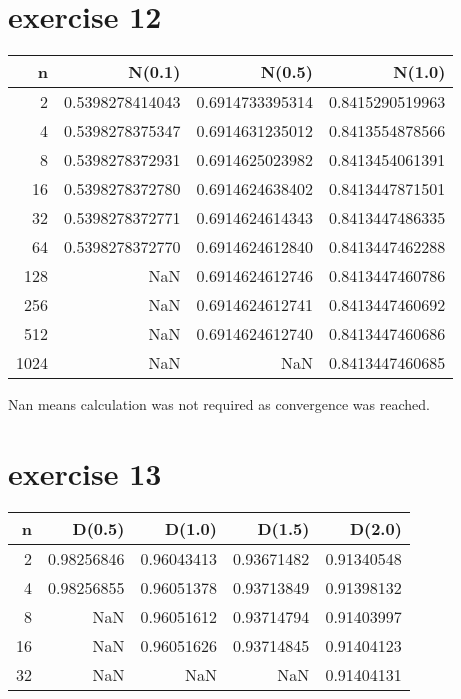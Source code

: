 \documentclass{article}
\begin{document}
\section{exercise 12}
\begin{tabular}{rrrr}
    \toprule
    n    & N(0.1)          & N(0.5)          & N(1.0)          \\
    \midrule
    2    & 0.5398278414043 & 0.6914733395314 & 0.8415290519963 \\
    4    & 0.5398278375347 & 0.6914631235012 & 0.8413554878566 \\
    8    & 0.5398278372931 & 0.6914625023982 & 0.8413454061391 \\
    16   & 0.5398278372780 & 0.6914624638402 & 0.8413447871501 \\
    32   & 0.5398278372771 & 0.6914624614343 & 0.8413447486335 \\
    64   & 0.5398278372770 & 0.6914624612840 & 0.8413447462288 \\
    128  & NaN             & 0.6914624612746 & 0.8413447460786 \\
    256  & NaN             & 0.6914624612741 & 0.8413447460692 \\
    512  & NaN             & 0.6914624612740 & 0.8413447460686 \\
    1024 & NaN             & NaN             & 0.8413447460685 \\
    \bottomrule
\end{tabular}

Nan means calculation was not required as convergence was reached.

\section{exercise 13}

\begin{tabular}{rrrrr}
    \toprule
    n  & D(0.5)     & D(1.0)     & D(1.5)     & D(2.0)     \\
    \midrule
    2  & 0.98256846 & 0.96043413 & 0.93671482 & 0.91340548 \\
    4  & 0.98256855 & 0.96051378 & 0.93713849 & 0.91398132 \\
    8  & NaN        & 0.96051612 & 0.93714794 & 0.91403997 \\
    16 & NaN        & 0.96051626 & 0.93714845 & 0.91404123 \\
    32 & NaN        & NaN        & NaN        & 0.91404131 \\
    \bottomrule
\end{tabular}
\end{document}
